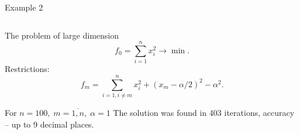 \begin{frame}{Example 2}

\begin{columns}[T]

\begin{column}[T]{0.5\textwidth}
\begin{block}{The problem of large dimension}
$$
f_0=\sum_{i=1}^nx_i^2\rightarrow\min.
$$
\noindent Restrictions:
$$
f_m=\sum_{i=1,i\neq m}^nx_i^2+(x_m-\alpha/2)^2-\alpha^2.
$$
\end{block}

\begin{block}{For $n=100,\; m=\overline{1,n},\;\alpha=1$}
The solution was found in 403 iterations, accuracy -- up to 9 decimal places.
\end{block}

\end{column}

\begin{column}[T]{0.465\textwidth}

\begin{center}
\texttt{[image: \\figpath\{EmTime]}}
\end{center}

\begin{block}{1 thread: 78 s. Time rate:}
\begin{tabular}{ll}
2 threads:  & $T_2=44.89$ s. \\
8 threads: & $T_8=28.14$ s. \\
\end{tabular}
\end{block}

\end{column}

\end{columns}

\end{frame}